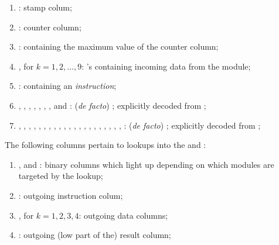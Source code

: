 \begin{enumerate}
	\item \oobStamp{}:
		stamp colum;
	\item \ct{}:
		counter column;
	\item \maxCt{}:
		\ccc{} containing the maximum value of the counter column;
	\item {}, for $k = 1, 2, \dots, 9$: \godGiven{}
		\ccc{}'s containing incoming data from the \hubMod{} module;
	\item \oobInstruction{}: \godGiven{}
		\ccc{} containing an \emph{\oobMod{} instruction};
	\item
		\oobInstIsJump{},
		\oobInstIsJumpI{},
		\oobInstIsRdc{},
		\oobInstIsCdl{},
		\oobInstIsXcall{},
		\oobInstIsCall{},
		\oobInstIsCreate{},
		\oobInstIsSstore{} and 
		\oobInstIsDeployment{}:
		(\emph{de facto}) \ccbc{}; explicitly decoded from \oobInst{};
	\item 
		\oobInstIsEcrecover{},
		\oobInstIsShaTwo{},
		\oobInstIsRipemd{},
		\oobInstIsIdentity{},
		\oobInstIsEcadd{},
		\oobInstIsEcmul{},
		\oobInstIsEcpairing{},
		\oobInstIsPointEvaluation{},
		\oobInstIsBlakeCds{},
		\oobInstIsBlakeParams{},
		\oobInstIsModexpCds{},
		\oobInstIsModexpXbs{},
		\oobInstIsModexpLead{},
		\oobInstIsModexpPricing{},
		\oobInstIsModexpExtract{},
		\oobInstIsBlsGOneAdd{},
		\oobInstIsBlsGOneMsm{},
		\oobInstIsBlsGTwoAdd{},
		\oobInstIsBlsGTwoMsm{},
		\oobInstIsBlsPairingCheck{},
		\oobInstIsBlsMapFpToGOne{},
		\oobInstIsBlsMapFpTwoToGTwo{}:
		(\emph{de facto}) \ccbc{}; explicitly decoded from \oobInstruction{};
\end{enumerate}
The following columns pertain to lookups into the \wcpMod{} and \addMod{}: 
\begin{enumerate}[resume]
	\item \wcpFlag{}, \addFlag{} and \modFlag{}:
		binary columns which light up depending on which modules are targeted by the lookup;
	\item \outgoingInst{}:
		outgoing instruction colum;
	\item {}, for $k = 1, 2, 3, 4$:
		outgoing data columns;
	\item \outgoingResLo{}:
		outgoing (low part of the) result column;
\end{enumerate}
